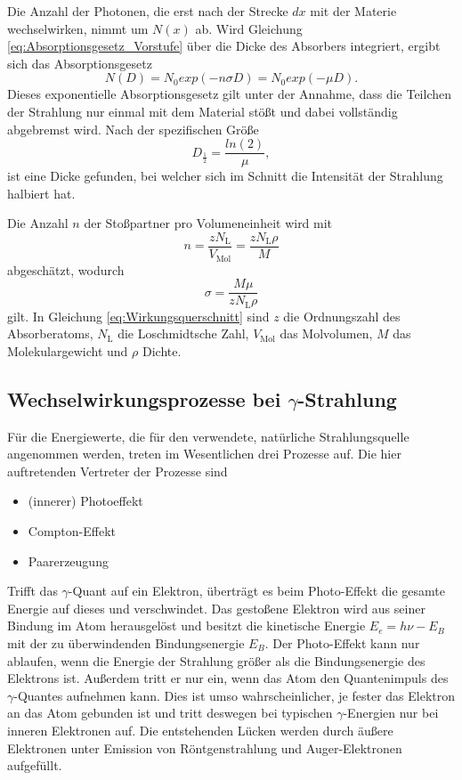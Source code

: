 Die Anzahl der Photonen, die erst nach der Strecke $dx$ mit der Materie wechselwirken, nimmt um $N(x)$ ab. 
Wird Gleichung \eqref{eq:Absorptionsgesetz_Vorstufe} über die Dicke des Absorbers integriert, ergibt sich das Absorptionsgesetz
\begin{equation}
	N(D)=N_0 exp(-n \sigma D)=N_0 exp(-\mu D).
	\label{eq:Absorptionsgesetz}
\end{equation}
Dieses exponentielle Absorptionsgesetz gilt unter der Annahme, dass die Teilchen der Strahlung nur einmal mit dem Material stößt und dabei vollständig abgebremst wird.
Nach der spezifischen Größe
\begin{equation}
	D_\frac{1}{2}=\frac{ln(2)}{\mu},
\end{equation}
ist eine Dicke gefunden, bei welcher sich im Schnitt die Intensität der Strahlung halbiert hat.

Die Anzahl $n$ der Stoßpartner pro Volumeneinheit wird mit
\begin{equation}
	n=\frac{zN_\text{L}}{V_\text{Mol}}=\frac{zN_\text{L}\rho}{M}
\end{equation}
abgeschätzt, wodurch 
\begin{equation}
	\sigma=\frac{M\mu}{zN_\text{L}\rho}
	\label{eq:Wirkungsquerschnitt}
\end{equation}
gilt.
In Gleichung \ref{eq:Wirkungsquerschnitt} sind $z$ die Ordnungszahl des Absorberatoms, $N_\text{L}$ die Loschmidtsche Zahl, $V_\text{Mol}$ das Molvolumen, $M$ das Molekulargewicht und $\rho$ Dichte.



\subsection{Wechselwirkungsprozesse bei \texorpdfstring{$\gamma$}{Gamma}-Strahlung}
Für die Energiewerte, die für den verwendete, natürliche Strahlungsquelle angenommen werden, treten im Wesentlichen drei Prozesse auf.
Die hier auftretenden Vertreter der Prozesse sind 
\begin{itemize}
	\item{(innerer) Photoeffekt}
	\item{Compton-Effekt}
	\item{Paarerzeugung}
\end{itemize}
Trifft das $\gamma$-Quant auf ein Elektron, überträgt es beim Photo-Effekt die gesamte Energie auf dieses und verschwindet. 
Das gestoßene Elektron wird aus seiner Bindung im Atom herausgelöst und besitzt die kinetische Energie $E_e=h\nu-E_B$ mit der zu überwindenden Bindungsenergie $E_B$. 
Der Photo-Effekt kann nur ablaufen, wenn die Energie der Strahlung größer als die Bindungsenergie des Elektrons ist. 
Außerdem tritt er nur ein, wenn das Atom den Quantenimpuls des $\gamma$-Quantes aufnehmen kann. 
Dies ist umso wahrscheinlicher, je fester das Elektron an das Atom gebunden ist und tritt deswegen bei typischen $\gamma$-Energien nur bei inneren Elektronen auf. 
Die entstehenden Lücken werden durch äußere Elektronen unter Emission von Röntgenstrahlung und Auger-Elektronen aufgefüllt.

